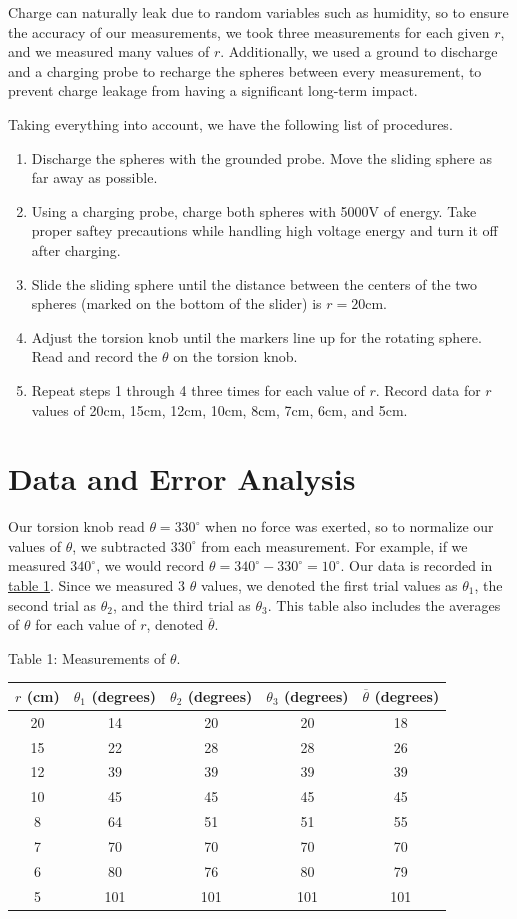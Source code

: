 \documentclass[11pt, letterpaper]{report}
\begin{document}
Charge can naturally leak due to random variables such as humidity, so to ensure the accuracy of our measurements, we took three measurements for each given $r$, and we measured many values of $r$. Additionally, we used a ground to discharge and a charging probe to recharge the spheres between every measurement, to prevent charge leakage from having a significant long-term impact.

Taking everything into account, we have the following list of procedures.
\begin{enumerate}
	\item Discharge the spheres with the grounded probe. Move the sliding sphere as far away as possible.
	\item Using a charging probe, charge both spheres with 5000V of energy. Take proper saftey precautions while handling high voltage energy and turn it off after charging.
	\item Slide the sliding sphere until the distance between the centers of the two spheres (marked on the bottom of the slider) is $r=20\text{cm}$.
	\item Adjust the torsion knob until the markers line up for the rotating sphere. Read and record the $\theta $ on the torsion knob.
	\item Repeat steps 1 through 4 three times for each value of $r$. Record data for $r$ values of 20cm, 15cm, 12cm, 10cm, 8cm, 7cm, 6cm, and 5cm.
\end{enumerate}
\section{Data and Error Analysis}
Our torsion knob read $\theta =330^\circ $ when no force was exerted, so to normalize our values of $\theta $, we subtracted $330^\circ $ from each measurement. For example, if we measured $340^\circ $, we would record $\theta =340^\circ -330^\circ =10^\circ $. Our data is recorded in \hyperref[tab:1]{table 1}. Since we measured 3 $\theta $ values, we denoted the first trial values as $\theta _1$, the second trial as $\theta _2$, and the third trial as $\theta _3$. This table also includes the averages of $\theta $ for each value of $r$, denoted $\overline{\theta } $.
\begin{center}
	Table 1: Measurements of $\theta $.\\\vspace*{5pt}\label{tab:1}
	\begin{tabular}{c|c|c|c|c}
		$r$ (cm)&$\theta_1$ (degrees)&$\theta_2$ (degrees)&$\theta_3$ (degrees)&$\overline{\theta } $ (degrees)\\
		\hline
		20&14&20&20&18\\
		15&22&28&28&26\\
		12&39&39&39&39\\
		10&45&45&45&45\\
		8&64&51&51&55\\
		7&70&70&70&70\\
		6&80&76&80&79\\
		5&101&101&101&101
	\end{tabular}
\end{center}
\end{document}
